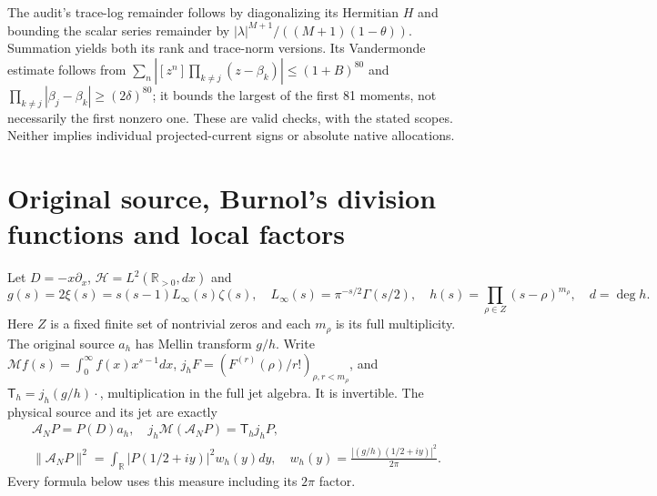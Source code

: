 The audit's trace-log remainder follows by diagonalizing its Hermitian
$H$ and bounding the scalar series remainder by
$|\lambda|^{M+1}/((M+1)(1-\theta))$. Summation yields both its
rank and trace-norm versions. Its Vandermonde estimate follows from
$\sum_n|[z^n]\prod_{k\ne j}(z-\beta_k)|\le(1+B)^{80}$ and
$\prod_{k\ne j}|\beta_j-\beta_k|\ge(2\delta)^{80}$; it bounds
the largest of the first 81 moments, not necessarily the first nonzero
one. These are valid checks, with the stated scopes. Neither implies
individual projected-current signs or absolute native allocations.

\section{Original source, Burnol's division functions and local factors}
Let $D=-x\partial_x$, $\mathcal H=L^2(\mathbb R_{>0},dx)$ and
\[
 g(s)=2\xi(s)=s(s-1)L_\infty(s)\zeta(s),\quad
 L_\infty(s)=\pi^{-s/2}\Gamma(s/2),\quad
 h(s)=\prod_{\rho\in Z}(s-\rho)^{m_\rho},\quad d=\deg h.\tag{LR1}
\]
Here $Z$ is a fixed finite set of nontrivial zeros and each $m_\rho$ is
its full multiplicity. The original source $a_h$ has Mellin transform
$g/h$. Write $\mathcal M f(s)=\int_0^\infty f(x)x^{s-1}dx$,
$j_hF=(F^{(r)}(\rho)/r!)_{\rho,r<m_\rho}$, and
$\mathsf T_h=j_h(g/h)\cdot$, multiplication in the full jet algebra.
It is invertible. The physical source and its jet are exactly
\[
 \begin{gathered}
 \mathcal A_NP=P(D)a_h,\quad j_h\mathcal M(\mathcal A_NP)
 =\mathsf T_hj_hP,\\
 \|\mathcal A_NP\|^2=\int_{\mathbb R}|P(1/2+iy)|^2w_h(y)dy,
 \quad w_h(y)=\frac{|(g/h)(1/2+iy)|^2}{2\pi}.
 \end{gathered}\tag{LR2}
\]
Every formula below uses this measure including its $2\pi$ factor.

